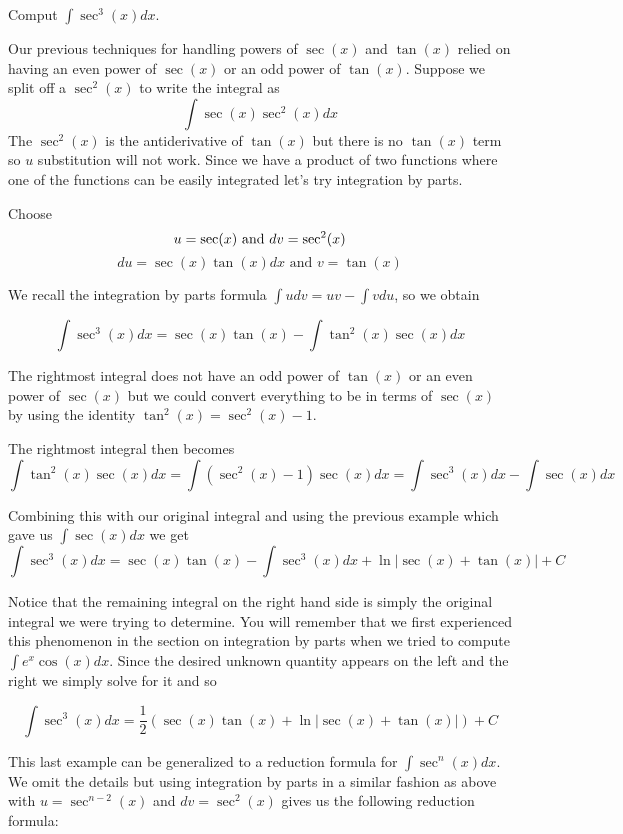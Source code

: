 \documentclass{ximera}
\begin{document}
\begin{example}
Comput $\int \sec^{3}(x) dx $.

\begin{explanation}
Our previous techniques for handling powers of $\sec(x)$ and $\tan(x)$ relied on having an even power of $\sec(x)$ or an odd power of $\tan(x)$. 
Suppose we split off a $\sec^{2}(x)$ to write the integral as 
\[
 \int \sec(x) \sec^{2}(x) dx
\]
The $\sec^{2}(x)$ is the antiderivative of $\tan(x)$ but there is no $\tan(x)$ term so $u$ substitution will not work. Since we have a product of two functions where one 
of the functions can be easily integrated let's try integration by parts. 

Choose
\[ 
u= \sec(x) \text{  and  } dv=\sec^{2}(x) \\
\] 
\[
du=  \sec(x)\tan(x) dx \text{  and  } v=\tan(x) 
\]

We recall the integration by parts formula $\int u dv=uv-\int v du$, so we obtain

\[
\int \sec^{3}(x) dx=\sec(x)\tan(x) - \int \tan^{2}(x)\sec(x)dx
\]

The rightmost integral does not have an odd power of $\tan(x)$ or an even power of $\sec(x)$ but we could convert 
everything to be in terms of $\sec(x)$ by using the identity $\tan^{2}(x)=\sec^{2}(x)-1$. 

The rightmost integral then becomes
\[
\int \tan^{2}(x)\sec(x) dx=\int (\sec^{2}(x)-1) \sec(x) dx= \int \sec^{3}(x)dx - \int \sec(x) dx
\]

Combining this with our original integral and using the previous example which gave us $\int \sec(x) dx$ we get
\[
\int \sec^3(x)  dx=\sec(x) \tan(x)- \int \sec^3(x)  dx + \ln| \sec(x)+\tan(x) | + C
\]

Notice that the remaining integral on the right hand side is simply the original integral we were trying to determine. You will remember that we first experienced this phenomenon in the section on integration by parts when we tried to compute $\int e^{x}\cos(x) dx$. 
Since the desired unknown quantity appears on the left and the right we simply solve for it and so

\[
\int \sec^{3}(x) dx=\frac{1}{2}\left(\sec(x) \tan(x) + \ln | \sec(x) + \tan(x)|  \right)  + C
\]
\end{explanation}
\end{example}

This last example can be generalized to a reduction formula for $\int \sec^{n}(x) dx$. We omit the details but using integration by parts in a similar fashion
as above with $u=\sec^{n-2}(x)$ and $dv=\sec^{2}(x)$ gives us the following reduction formula:
\end{document}
